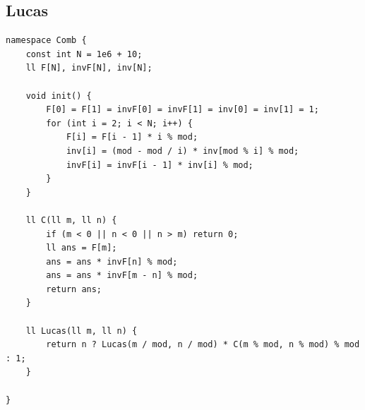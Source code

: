 \documentclass[twoside]{article}
\begin{document}
\subsection{Lucas}
\begin{lstlisting}
namespace Comb {
    const int N = 1e6 + 10;
    ll F[N], invF[N], inv[N];

    void init() {
        F[0] = F[1] = invF[0] = invF[1] = inv[0] = inv[1] = 1;
        for (int i = 2; i < N; i++) {
            F[i] = F[i - 1] * i % mod;
            inv[i] = (mod - mod / i) * inv[mod % i] % mod;
            invF[i] = invF[i - 1] * inv[i] % mod;
        }
    }

    ll C(ll m, ll n) {
        if (m < 0 || n < 0 || n > m) return 0;
        ll ans = F[m];
        ans = ans * invF[n] % mod;
        ans = ans * invF[m - n] % mod;
        return ans;
    }

    ll Lucas(ll m, ll n) {
        return n ? Lucas(m / mod, n / mod) * C(m % mod, n % mod) % mod : 1;
    }

}\end{lstlisting}
\end{document}
